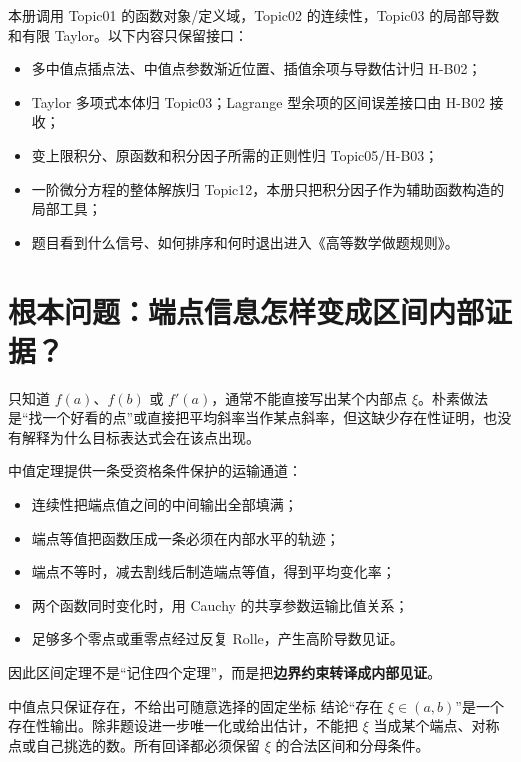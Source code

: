 \documentclass[UTF8,fontset=none,11pt,a4paper]{ctexart}
\begin{document}
本册调用 Topic01 的函数对象/定义域，Topic02 的连续性，Topic03 的局部导数和有限 Taylor。以下内容只保留接口：
\begin{itemize}
  \item 多中值点插点法、中值点参数渐近位置、插值余项与导数估计归 H-B02；
  \item Taylor 多项式本体归 Topic03；Lagrange 型余项的区间误差接口由 H-B02 接收；
  \item 变上限积分、原函数和积分因子所需的正则性归 Topic05/H-B03；
  \item 一阶微分方程的整体解族归 Topic12，本册只把积分因子作为辅助函数构造的局部工具；
  \item 题目看到什么信号、如何排序和何时退出进入《高等数学做题规则》。
\end{itemize}

\section{根本问题：端点信息怎样变成区间内部证据？}

只知道 $f(a)$、$f(b)$ 或 $f'(a)$，通常不能直接写出某个内部点 $\xi$。朴素做法是“找一个好看的点”或直接把平均斜率当作某点斜率，但这缺少存在性证明，也没有解释为什么目标表达式会在该点出现。

中值定理提供一条受资格条件保护的运输通道：
\begin{itemize}
  \item 连续性把端点值之间的中间输出全部填满；
  \item 端点等值把函数压成一条必须在内部水平的轨迹；
  \item 端点不等时，减去割线后制造端点等值，得到平均变化率；
  \item 两个函数同时变化时，用 Cauchy 的共享参数运输比值关系；
  \item 足够多个零点或重零点经过反复 Rolle，产生高阶导数见证。
\end{itemize}

因此区间定理不是“记住四个定理”，而是把\textbf{边界约束转译成内部见证}。

\begin{corebox}{中值点只保证存在，不给出可随意选择的固定坐标}
结论“存在 $\xi\in(a,b)$”是一个存在性输出。除非题设进一步唯一化或给出估计，不能把 $\xi$ 当成某个端点、对称点或自己挑选的数。所有回译都必须保留 $\xi$ 的合法区间和分母条件。
\end{corebox}
\end{document}
